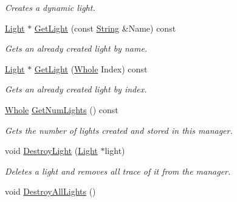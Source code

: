 \begin{DoxyCompactItemize}
\begin{DoxyCompactList}\small\item\em Creates a dynamic light. \item\end{DoxyCompactList}\item 
\hyperlink{classphys_1_1Light}{Light} $\ast$ \hyperlink{classphys_1_1SceneManager_a00849466a4248d71f7e1ecfd5a07a89c}{GetLight} (const \hyperlink{namespacephys_aa03900411993de7fbfec4789bc1d392e}{String} \&Name) const 
\begin{DoxyCompactList}\small\item\em Gets an already created light by name. \item\end{DoxyCompactList}\item 
\hyperlink{classphys_1_1Light}{Light} $\ast$ \hyperlink{classphys_1_1SceneManager_a3c5aaeb80eed8032d6f9417073d2be8b}{GetLight} (\hyperlink{namespacephys_a460f6bc24c8dd347b05e0366ae34f34a}{Whole} Index) const 
\begin{DoxyCompactList}\small\item\em Gets an already created light by index. \item\end{DoxyCompactList}\item 
\hyperlink{namespacephys_a460f6bc24c8dd347b05e0366ae34f34a}{Whole} \hyperlink{classphys_1_1SceneManager_aa1eaa692e63a6d8e328d2f0e4a2f9bf8}{GetNumLights} () const 
\begin{DoxyCompactList}\small\item\em Gets the number of lights created and stored in this manager. \item\end{DoxyCompactList}\item 
void \hyperlink{classphys_1_1SceneManager_a0f6ebec4e8a372b0fcc2b2205bac7725}{DestroyLight} (\hyperlink{classphys_1_1Light}{Light} $\ast$light)
\begin{DoxyCompactList}\small\item\em Deletes a light and removes all trace of it from the manager. \item\end{DoxyCompactList}\item 
\hypertarget{classphys_1_1SceneManager_a6246fbc7c12300416dfc99bdbb22d002}{
void \hyperlink{classphys_1_1SceneManager_a6246fbc7c12300416dfc99bdbb22d002}{DestroyAllLights} ()}
\label{dd/da8/classphys_1_1SceneManager_a6246fbc7c12300416dfc99bdbb22d002}


\end{DoxyCompactItemize}
